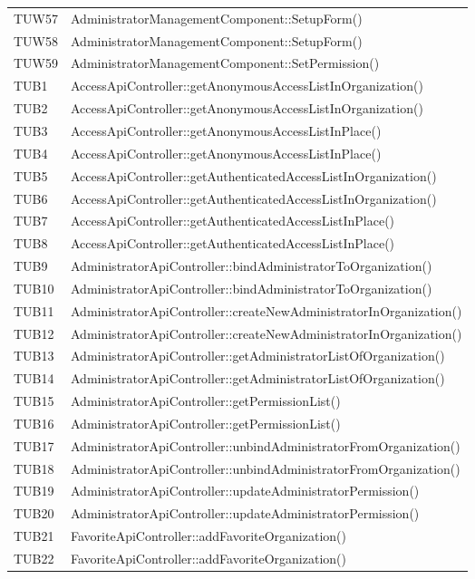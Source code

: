 {\begin{longtable}{C{2cm} C{8cm}}
TUW57 & AdministratorManagementComponent::SetupForm()\\
TUW58 & AdministratorManagementComponent::SetupForm()\\
TUW59 & AdministratorManagementComponent::SetPermission()\\
TUB1 & AccessApiController::getAnonymousAccessListInOrganization()\\
TUB2 & AccessApiController::getAnonymousAccessListInOrganization()\\
TUB3 & AccessApiController::getAnonymousAccessListInPlace()\\
TUB4 & AccessApiController::getAnonymousAccessListInPlace()\\
TUB5 & AccessApiController::getAuthenticatedAccessListInOrganization()\\
TUB6 & AccessApiController::getAuthenticatedAccessListInOrganization()\\
TUB7 & AccessApiController::getAuthenticatedAccessListInPlace()\\
TUB8 & AccessApiController::getAuthenticatedAccessListInPlace()\\
TUB9 & AdministratorApiController::bindAdministratorToOrganization()\\
TUB10 & AdministratorApiController::bindAdministratorToOrganization()\\
TUB11 & AdministratorApiController::createNewAdministratorInOrganization()\\
TUB12 & AdministratorApiController::createNewAdministratorInOrganization()\\
TUB13 & AdministratorApiController::getAdministratorListOfOrganization()\\
TUB14 & AdministratorApiController::getAdministratorListOfOrganization()\\
TUB15 & AdministratorApiController::getPermissionList()\\
TUB16 & AdministratorApiController::getPermissionList()\\
TUB17 & AdministratorApiController::unbindAdministratorFromOrganization()\\
TUB18 & AdministratorApiController::unbindAdministratorFromOrganization()\\
TUB19 & AdministratorApiController::updateAdministratorPermission()\\
TUB20 & AdministratorApiController::updateAdministratorPermission()\\
TUB21 & FavoriteApiController::addFavoriteOrganization()\\
TUB22 & FavoriteApiController::addFavoriteOrganization()\\

\end{longtable}}
